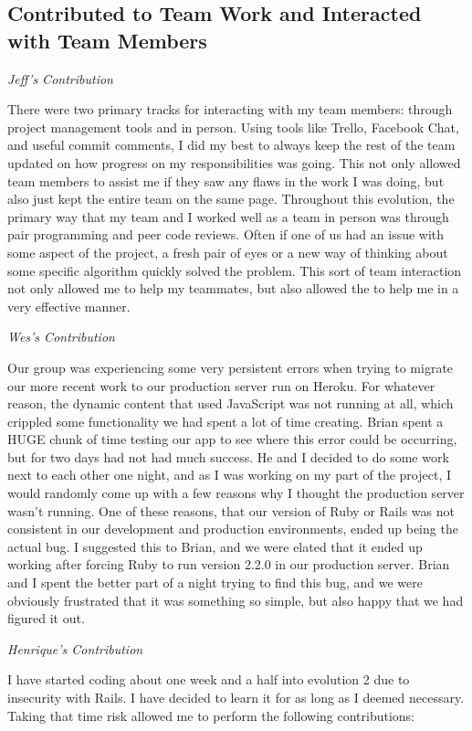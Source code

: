 \documentclass[11pt]{article}
\begin{document}
\subsection{Contributed to Team Work and Interacted with Team Members}

\textit{Jeff's Contribution}

There were two primary tracks for interacting with my team members: through project management tools and in person.  Using tools like Trello, Facebook Chat, and useful commit comments, I did my best to always keep the rest of the team updated on how progress on my responsibilities was going.  This not only allowed team members to assist me if they saw any flaws in the work I was doing, but also just kept the entire team on the same page.  Throughout this evolution, the primary way that my team and I worked well as a team in person was through pair programming and peer code reviews.  Often if one of us had an issue with some aspect of the project, a fresh pair of eyes or a new way of thinking about some specific algorithm quickly solved the problem.  This sort of team interaction not only allowed me to help my teammates, but also allowed the to help me in a very effective manner.

\textit{Wes's Contribution}

Our group was experiencing some very persistent errors when trying to migrate our more recent work to our production server run on Heroku.  For whatever reason, the dynamic content that used JavaScript was not running at all, which crippled some functionality we had spent a lot of time creating.  Brian spent a HUGE chunk of time testing our app to see where this error could be occurring, but for two days had not had much success.  He and I decided to do some work next to each other one night, and as I was working on my part of the project, I would randomly come up with a few reasons why I thought the production server wasn’t running.  One of these reasons, that our version of Ruby or Rails was not consistent in our development and production environments, ended up being the actual bug.  I suggested this to Brian, and we were elated that it ended up working after forcing Ruby to run version 2.2.0 in our production server.  Brian and I spent the better part of a night trying to find this bug, and we were obviously frustrated that it was something so simple, but also happy that we had figured it out.

\textit{Henrique's Contribution}

I have started coding about one week and a half into evolution 2 due to insecurity with Rails. I have decided to learn it for as long as I deemed necessary. Taking that time risk allowed me to perform the following contributions:
\end{document}
